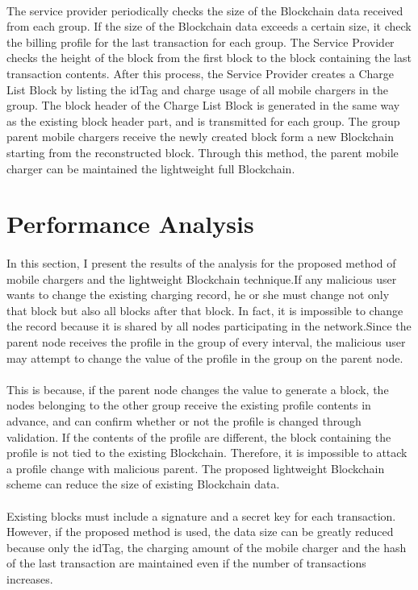 \paragraph{}The service provider
periodically checks the size of the Blockchain data received
from each group. If the size of the Blockchain data exceeds a
certain size, it check the billing profile for the last transaction
for each group. The Service Provider checks the height of the
block from the first block to the block containing the last
transaction contents. After this process, the Service Provider
creates a Charge List Block by listing the idTag and charge
usage of all mobile chargers in the group. The block header of
the Charge List Block is generated in the same way as the
existing block header part, and is transmitted for each group.
The group parent mobile chargers receive the newly created
block form a new Blockchain starting from the reconstructed
block. Through this method, the parent mobile charger can be
maintained the lightweight full Blockchain.

\section{Performance Analysis}  

\paragraph{}In this section, I present the results of the analysis for the
proposed method of mobile chargers and the lightweight
Blockchain technique.If any malicious user wants to change the existing charging
record, he or she must change not only that block but also all
blocks after that block. In fact, it is impossible to change the
record because it is shared by all nodes participating in the
network.Since the parent node receives the profile in the group of
every interval, the malicious user may attempt to change the
value of the profile in the group on the parent node.
\paragraph{} This is
because, if the parent node changes the value to generate a
block, the nodes belonging to the other group receive the
existing profile contents in advance, and can confirm whether
or not the profile is changed through validation. If the contents
of the profile are different, the block containing the profile is
not tied to the existing Blockchain. Therefore, it is impossible
to attack a profile change with malicious parent.
The proposed lightweight Blockchain scheme can reduce
the size of existing Blockchain data.
\paragraph{} Existing blocks must
include a signature and a secret key for each transaction.
However, if the proposed method is used, the data size can be
greatly reduced because only the idTag, the charging amount
of the mobile charger and the hash of the last transaction are
maintained even if the number of transactions increases.



